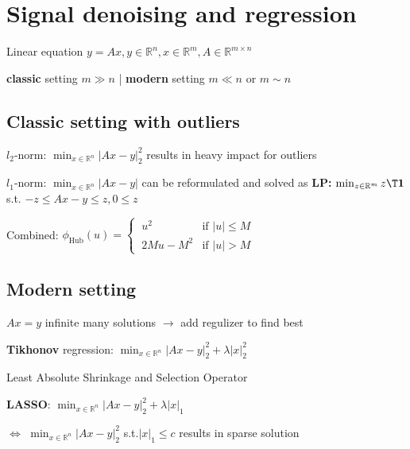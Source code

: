 \section{Signal denoising and regression}


Linear equation $y=Ax, y \in \mathbb{R}^{n}, x \in \mathbb{R}^{m}, A \in \mathbb{R}^{m \times n}$

\textbf{classic} setting $m \gg n$
|
\textbf{modern} setting $m\ll n$ or $m \sim n$

\subsection{Classic setting with outliers}

$l_2$-norm:
$\min_{x \in \mathbb{R}^{n}}|Ax-y|_2^2$
results in heavy impact for outliers

$l_1$-norm:
$\min_{x \in \mathbb{R}^{n}}|Ax-y|$
can be reformulated and solved as
\textbf{LP:}
$\min_{z\in\mathbb{R}^{m}}z\T\mathbf{1}$
s.t.
$-z\le Ax-y\le z, 0\le z$

Combined:
$\phi_\text{Hub}(u) =
	\begin{cases}
		\ u^2     & \text{if }|u|\le M \\
		\ 2Mu-M^2 & \text{if }|u|>M
	\end{cases}$
\vspace{2mm}

\subsection{Modern setting}

$Ax=y$ infinite many solutions
$\rightarrow$
add regulizer to find best

\textbf{Tikhonov} regression:
$\min_{x \in \mathbb{R}^{n}}|Ax-y|_2^2 + \lambda |x|_2^2$

Least Absolute Shrinkage and Selection Operator

\textbf{LASSO}:
$ \min_{x \in \mathbb{R}^{n}}|Ax-y|_2^2 + \lambda |x|_1$

$\Leftrightarrow$
$ \min_{x \in \mathbb{R}^{n}}|Ax-y|_2^2$ s.t.$|x|_1\le c$
results in sparse solution

